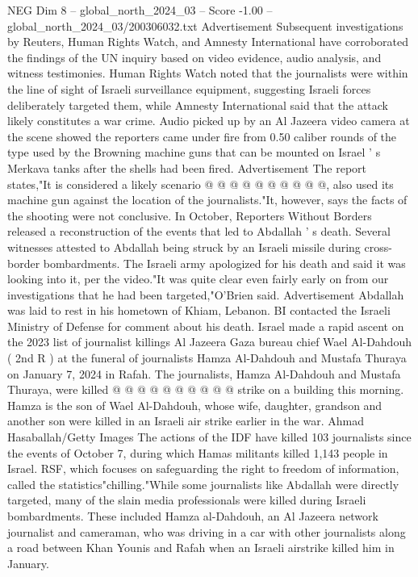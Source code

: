 \begin{textsample}{NEG Dim 8 – global\_north\_2024\_03 – Score -1.00 – global\_north\_2024\_03/200306032.txt}
Advertisement Subsequent investigations by Reuters, Human Rights Watch, and Amnesty International have corroborated the findings of the UN inquiry based on video evidence, audio analysis, and witness testimonies.
Human Rights Watch noted that the journalists were within the line of sight of Israeli surveillance equipment, suggesting Israeli forces deliberately targeted them, while Amnesty International said that the attack likely constitutes a war crime.
Audio picked up by an Al Jazeera video camera at the scene showed the reporters came under fire from 0.50 caliber rounds of the type used by the Browning machine guns that can be mounted on Israel ' s Merkava tanks after the shells had been fired.
Advertisement The report states,"It is considered a likely scenario @ @ @ @ @ @ @ @ @ @, also used its machine gun against the location of the journalists."It, however, says the facts of the shooting were not conclusive.
In October, Reporters Without Borders released a reconstruction of the events that led to Abdallah ' s death.
Several witnesses attested to Abdallah being struck by an Israeli missile during cross-border bombardments.
The Israeli army apologized for his death and said it was looking into it, per the video."It was quite clear even fairly early on from our investigations that he had been targeted,"O'Brien said.
Advertisement Abdallah was laid to rest in his hometown of Khiam, Lebanon.
BI contacted the Israeli Ministry of Defense for comment about his death.
Israel made a rapid ascent on the 2023 list of journalist killings Al Jazeera Gaza bureau chief Wael Al-Dahdouh ( 2nd R ) at the funeral of journalists Hamza Al-Dahdouh and Mustafa Thuraya on January 7, 2024 in Rafah.
The journalists, Hamza Al-Dahdouh and Mustafa Thuraya, were killed @ @ @ @ @ @ @ @ @ @ strike on a building this morning.
Hamza is the son of Wael Al-Dahdouh, whose wife, daughter, grandson and another son were killed in an Israeli air strike earlier in the war.
Ahmad Hasaballah/Getty Images The actions of the IDF have killed 103 journalists since the events of October 7, during which Hamas militants killed 1,143 people in Israel.
RSF, which focuses on safeguarding the right to freedom of information, called the statistics"chilling."While some journalists like Abdallah were directly targeted, many of the slain media professionals were killed during Israeli bombardments.
These included Hamza al-Dahdouh, an Al Jazeera network journalist and cameraman, who was driving in a car with other journalists along a road between Khan Younis and Rafah when an Israeli airstrike killed him in January.

\end{textsample}
